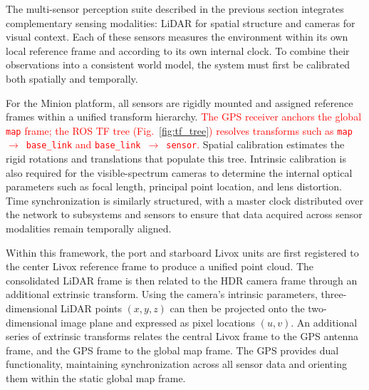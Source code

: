 \documentclass{erauthesis}
\begin{document}
The multi-sensor perception suite described in the previous section integrates complementary sensing modalities: \ac{LiDAR} for spatial structure and cameras for visual context.
Each of these sensors measures the environment within its own local reference frame and according to its own internal clock.
To combine their observations into a consistent world model, the system must first be calibrated both spatially and temporally.

For the Minion platform, all sensors are rigidly mounted and assigned reference frames within a unified transform hierarchy. 
\textcolor{red}{The GPS receiver anchors the global \texttt{map} frame; the ROS TF tree (Fig.~\ref{fig:tf_tree}) resolves transforms such as \texttt{map}\ $\rightarrow$\ \texttt{base\_link} and \texttt{base\_link}\ $\rightarrow$\ \texttt{sensor}.}
Spatial calibration estimates the rigid rotations and translations that populate this tree.  
Intrinsic calibration is also required for the visible-spectrum cameras to determine the internal optical parameters such as focal length, principal point location, and lens distortion. 
Time synchronization is similarly structured, with a master clock distributed over the network to subsystems and sensors to ensure that data acquired across sensor modalities remain temporally aligned.

Within this framework, the port and starboard Livox units are first registered to the center Livox reference frame to produce a unified point cloud. 
The consolidated LiDAR frame is then related to the HDR camera frame through an additional extrinsic transform. 
Using the camera’s intrinsic parameters, three-dimensional LiDAR points $(x, y, z)$ can then be projected onto the two-dimensional image plane and expressed as pixel locations $(u, v)$. 
An additional series of extrinsic transforms relates the central Livox frame to the \ac{GPS} antenna frame, and the \ac{GPS} frame to the global map frame. 
The \ac{GPS} provides dual functionality, maintaining synchronization across all sensor data and orienting them within the static global map frame.
\end{document}
